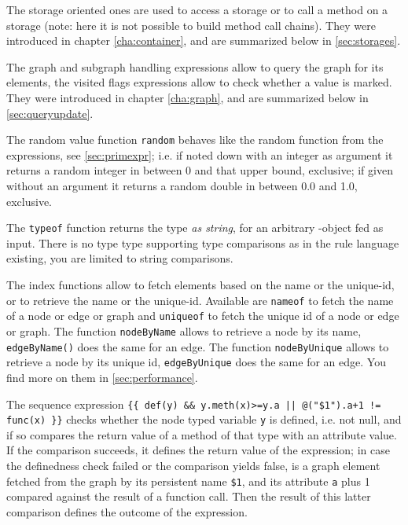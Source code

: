 The storage oriented ones are used to access a storage or to call a method on a storage (note: here it is not possible to build method call chains). 
They were introduced in chapter \ref{cha:container}, and are summarized below in \ref{sec:storages}.

The graph and subgraph handling expressions allow to query the graph for its elements, the visited flags expressions allow to check whether a value is marked.
They were introduced in chapter \ref{cha:graph}, and are summarized below in \ref{sec:queryupdate}.

The random value function \texttt{random} behaves like the random function from the expressions, see \ref{sec:primexpr};
i.e. if noted down with an integer as argument it returns a random integer in between 0 and that upper bound, exclusive; if given without an argument it returns a random double in between 0.0 and 1.0, exclusive.

The \texttt{typeof} function returns the type \emph{as string}, for an arbitrary \GrG-object fed as input.
There is no type type supporting type comparisons as in the rule language existing, you are limited to string comparisons.

The index functions allow to fetch elements based on the name or the unique-id, or to retrieve the name or the unique-id.
Available are \texttt{nameof} to fetch the name of a node or edge or graph and \texttt{uniqueof} to fetch the unique id of a node or edge or graph.
The function \texttt{nodeByName} allows to retrieve a node by its name, \texttt{edgeByName()} does the same for an edge.
The function \texttt{nodeByUnique} allows to retrieve a node by its unique id, \texttt{edgeByUnique} does the same for an edge.
You find more on them in \ref{sec:performance}.

\begin{example}
The sequence expression \verb#{{ def(y) && y.meth(x)>=y.a || @("$1").a+1 != func(x) }}# checks whether the node typed variable \texttt{y} is defined, i.e. not null, and if so compares the return value of a method of that type with an attribute value. If the comparison succeeds, it defines the return value of the expression; in case the definedness check failed or the comparison yields false, is a graph element fetched from the graph by its persistent name \verb#$1#, and its attribute \texttt{a} plus 1 compared against the result of a function call. Then the result of this latter comparison defines the outcome of the expression.
\end{example}


